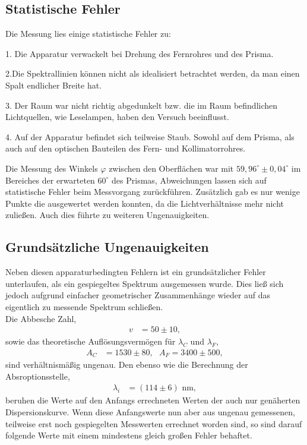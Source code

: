 %
%
\subsection{Statistische Fehler}
Die Messung lies einige statistische Fehler zu:

1. Die Apparatur verwackelt bei Drehung des Fernrohres und des Prisma.

2.Die Spektrallinien können nicht als idealisiert betrachtet werden, da man einen Spalt
endlicher Breite hat.

3. Der Raum war nicht richtig abgedunkelt bzw. die im Raum befindlichen Lichtquellen,
wie Leselampen, haben den Versuch beeinflusst.

4. Auf der Apparatur befindet sich teilweise Staub. Sowohl auf dem Prisma, als auch auf
den optischen Bauteilen des Fern- und Kollimatorrohres.

Die Messung des Winkels $\varphi$ zwischen den Oberflächen war mit $59,96^\circ \pm 0,04^\circ$ im Bereiches der erwarteten $60^\circ$ des Prismas, Abweichungen lassen sich auf statistische Fehler beim Messvorgang zurückführen.
Zusätzlich gab es nur wenige Punkte die ausgewertet werden konnten, da die Lichtverhältnisse mehr nicht zuließen. Auch dies führte zu weiteren Ungenauigkeiten.
\subsection{Grundsätzliche Ungenauigkeiten}
Neben diesen apparaturbedingten Fehlern ist ein grundsätzlicher Fehler unterlaufen, als ein gespiegeltes 
Spektrum ausgemessen wurde. Dies ließ sich jedoch aufgrund einfacher geometrischer Zusammenhänge wieder auf das eigentlich
zu messende Spektrum schließen. \\
Die Abbesche Zahl,
\begin{align}
v&=50\pm10,
\end{align}
sowie das theoretische Auflösungsvermögen für $\lambda_C$ und $\lambda_F$,
\begin{align}
A_C&=1530\pm80,\text{ }A_F=3400\pm500,
\end{align}
sind verhältnismäßig ungenau. Den ebenso wie die Berechnung der Absroptionsstelle,
\begin{align}
\lambda_i&=(114\pm 6)\text{ nm},
\end{align}
 beruhen die Werte auf den Anfangs errechneten Werten der auch nur genäherten Dispersionskurve. 
 Wenn diese Anfangswerte nun aber aus ungenau gemessenen, teilweise erst noch gespiegelten Messwerten 
 errechnet worden sind, so sind darauf folgende Werte mit einem mindestens gleich großen Fehler behaftet. 